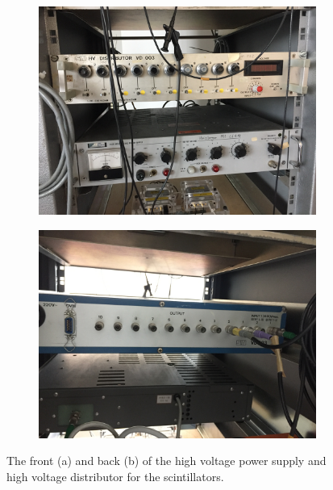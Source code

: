 \documentclass[12pt]{article}
\begin{document}
\begin{figure}
	\centering
		\begin{subfigure}[b]{0.8\textwidth}
				\includegraphics[width=1\linewidth]{pics/power_supply_distributor_front.JPG}
				\caption{}
				\label{fig:power_supply_front}
		\end{subfigure}
		\begin{subfigure}[b]{0.8\textwidth}
			\includegraphics[width=1\linewidth]{pics/distributor_back.JPG}
			\caption{}
			\label{fig:distributor}
		\end{subfigure}
\caption{The front (a)  and back (b) of the high voltage power supply and high voltage distributor for the scintillators.}
\end{figure}
\end{document}
